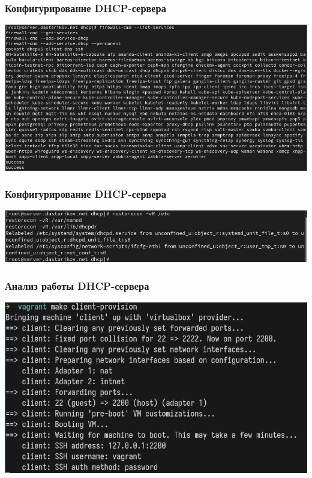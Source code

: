 \begin{frame}
\frametitle{Конфигурирование DHCP-сервера}
    \centering
    \includegraphics[width=\textwidth]{../images/image08.png}
\end{frame}


\begin{frame}
\frametitle{Конфигурирование DHCP-сервера}
    \centering
    \includegraphics[width=\textwidth]{../images/image09.png}
\end{frame}


\begin{frame}
\frametitle{Анализ работы DHCP-сервера}
    \centering
    \includegraphics[width=\textwidth]{../images/image10.png}
\end{frame}


